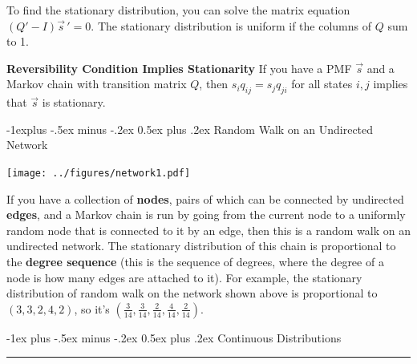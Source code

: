 \documentclass[10pt,landscape]{article}
\makeatletter
\renewcommand{\section}{\@startsection{section}{1}{0mm}%
{-1ex plus -.5ex minus -.2ex}%
{0.5ex plus .2ex}%
{\normalfont\large\bfseries}}
\renewcommand{\subsection}{\@startsection{subsection}{2}{0mm}%
{-1explus -.5ex minus -.2ex}%
{0.5ex plus .2ex}%
{\normalfont\normalsize\bfseries}}
\makeatother
\begin{document}
\begin{multicols*}{3}
        \smallskip

        To find the stationary distribution, you can solve the matrix equation $(Q' - I){\vec{s}\,}'= 0$. The stationary distribution is uniform if the columns of $Q$ sum to 1.

        \smallskip

        \textbf{Reversibility Condition Implies Stationarity}  If you have a PMF $\vec{s}$ and a Markov chain with transition matrix $Q$, then $s_iq_{ij} = s_jq_{ji}$ for all states $i, j$ implies that $\vec{s}$ is stationary.

        \subsection{Random Walk on an Undirected Network}
        \begin{minipage}{\linewidth}
            \centering
            \texttt{[image: ../figures/network1.pdf]}
        \end{minipage}
        \medskip

        If you have a collection of \textbf{nodes}, pairs of which can be connected by undirected \textbf{edges}, and a Markov chain is run by going from the current node to a uniformly random node that is connected to it by an edge, then this is a random walk on an undirected network. The stationary distribution of this chain is proportional to the \textbf{degree sequence} (this is the sequence of degrees, where the degree of a node is how many edges are attached to it). For example, the stationary distribution of random walk on the network shown above is proportional to $(3,3,2,4,2)$, so it's $(\frac{3}{14}, \frac{3}{14}, \frac{2}{14}, \frac{4}{14}, \frac{2}{14})$.


        \section{Continuous Distributions}\smallskip \hrule height 2pt \smallskip


\end{multicols*}
\end{document}
